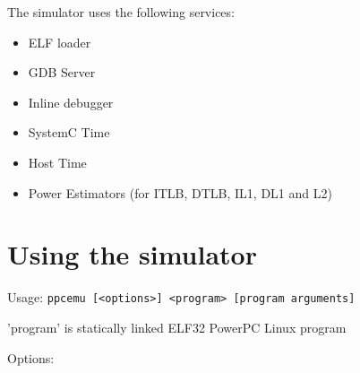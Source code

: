 The simulator uses the following services:
\begin{itemize}\addtolength{\itemsep}{-0.40\baselineskip}
\item ELF loader
\item GDB Server
\item Inline debugger
\item SystemC Time
\item Host Time
\item Power Estimators (for ITLB, DTLB, IL1, DL1 and L2)
\end{itemize}

\section{Using the simulator}

Usage: \texttt{ppcemu [<options>] <program> [program arguments]}

'program' is statically linked ELF32 PowerPC Linux program

Options:

